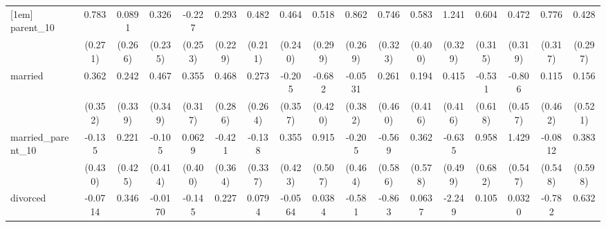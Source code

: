 {\begin{tabular}{l*{16}{c}}
[1em]
parent\_10           &       0.783\sym{**} &      0.0891         &       0.326         &      -0.227         &       0.293         &       0.482\sym{*}  &       0.464         &       0.518         &       0.862\sym{**} &       0.746\sym{*}  &       0.583         &       1.241\sym{***}&       0.604         &       0.472         &       0.776\sym{*}  &       0.428         \\
                    &     (0.271)         &     (0.266)         &     (0.235)         &     (0.253)         &     (0.229)         &     (0.211)         &     (0.240)         &     (0.299)         &     (0.269)         &     (0.323)         &     (0.400)         &     (0.329)         &     (0.315)         &     (0.319)         &     (0.317)         &     (0.297)         \\
[1em]
married             &       0.362         &       0.242         &       0.467         &       0.355         &       0.468         &       0.273         &      -0.205         &      -0.682         &     -0.0531         &       0.261         &       0.194         &       0.415         &      -0.531         &      -0.806         &       0.115         &       0.156         \\
                    &     (0.352)         &     (0.339)         &     (0.349)         &     (0.317)         &     (0.286)         &     (0.264)         &     (0.357)         &     (0.420)         &     (0.382)         &     (0.460)         &     (0.416)         &     (0.416)         &     (0.618)         &     (0.457)         &     (0.462)         &     (0.521)         \\
[1em]
married\_parent\_10   &      -0.135         &       0.221         &      -0.105         &      0.0629         &      -0.421         &      -0.138         &       0.355         &       0.915         &      -0.205         &      -0.569         &       0.362         &      -0.635         &       0.958         &       1.429\sym{**} &     -0.0812         &       0.383         \\
                    &     (0.430)         &     (0.425)         &     (0.414)         &     (0.400)         &     (0.364)         &     (0.337)         &     (0.423)         &     (0.507)         &     (0.464)         &     (0.586)         &     (0.578)         &     (0.499)         &     (0.682)         &     (0.547)         &     (0.548)         &     (0.598)         \\
[1em]
divorced            &     -0.0714         &       0.346         &     -0.0170         &      -0.145         &       0.227         &      0.0794         &     -0.0564         &      0.0384         &      -0.581         &      -0.863         &      0.0637         &      -2.249\sym{*}  &       0.105         &      0.0320         &      -0.782         &       0.632         \\

\end{tabular}}
